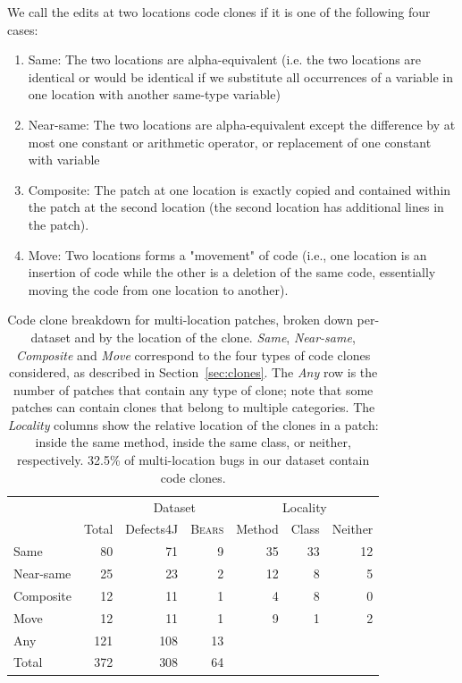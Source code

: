 \documentclass[10pt, conference]{IEEEtran}
\newcommand\bears{\textsc{Bears}\xspace}
\begin{document}
We call the edits at two locations code clones if it is one of the following four cases:
\begin{enumerate}
\item Same: The two locations are alpha-equivalent (i.e. the two locations are identical or would be
identical if we substitute all occurrences of a variable in one location with another same-type variable)
\item Near-same: The two locations are alpha-equivalent except the difference by at most one constant or arithmetic operator,
or replacement of one constant with variable
\item Composite: The patch at one location is exactly copied and contained within the patch at 
the 
second location (the second location  has additional lines in the patch).
\item Move: Two locations forms a "movement" of code (i.e., one location is an insertion of 
code 
while the other is a deletion of the same code, essentially moving the code from one location to 
another).
\end{enumerate}

\begin{table}
{\begin{center}
\begin{tabular} {lrrrrrr}
\toprule
&&\multicolumn{2}{c}{Dataset} &\multicolumn{3}{c}{Locality}\\
& Total & Defects4J & \bears & Method & Class & Neither\\
\midrule
Same      &  80 &  71 & 9 & 35 & 33 & 12 \\
Near-same   &  25 &  23 & 2 & 12 &  8 &  5 \\
Composite &  12 &  11 & 1 &  4 &  8 &  0 \\
Move      &  12 &  11 & 1 &  9 &  1 &  2 \\
\midrule
Any       & 121 & 108 & 13\\
Total     & 372 & 308 & 64\\
\bottomrule
\end{tabular}
\end{center}
}
\caption{Code clone breakdown for multi-location patches, broken down
  per-dataset and by the location of the clone. \emph{Same}, \emph{Near-same},
  \emph{Composite} and \emph{Move} correspond to the four types of code clones
  considered, as described in Section~\ref{sec:clones}.  The \emph{Any} row is the
  number of patches that contain any type of clone; note that some patches can
  contain clones that belong to multiple categories. The \emph{Locality} columns
  show the relative location of the clones in a patch: inside the same method,
  inside the same class, or neither, respectively. 32.5\% of multi-location bugs
  in our dataset contain code clones.}
\label{tab:clones}
\end{table}
\end{document}
